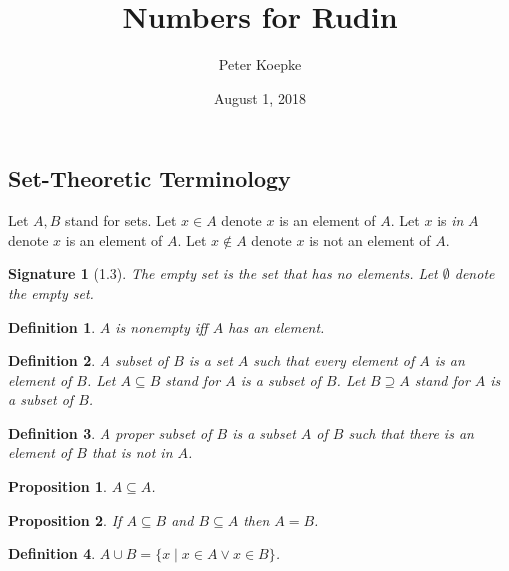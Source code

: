 \documentclass{article}
\newenvironment{forthel}{\begin{leftbar}}{\end{leftbar}}
\newtheorem{definition}{Definition}
\newtheorem{signature}{Signature}
\newtheorem{proposition}{Proposition}
\begin{document}
\title{Numbers for Rudin}

\author{Peter Koepke}

\date{August 1, 2018}

\maketitle

\subsection{Set-Theoretic Terminology}
\begin{forthel}


Let $A,B$ stand for sets.
Let $x \in A$ denote $x$ is an element of $A$.
Let $x$ is \emph{in} $A$ denote $x$ is an element of $A$.
Let $x \notin A$ denote $x$ is not an element of $A$.

\begin{signature}[1.3] The \emph{empty set} is the set that has no elements.
Let $\emptyset$ denote the empty set.
\end{signature}

\begin{definition} $A$ is \emph{nonempty} iff $A$ has an element.
\end{definition}

\begin{definition} A subset of $B$ is a set $A$ such that every element 
of $A$ is an element of $B$. 
Let $A \subseteq B$ stand for $A$ is a subset of $B$.
Let $B \supseteq A$ stand for $A$ is a subset of $B$.
\end{definition}

\begin{definition} A proper subset of $B$ is a subset $A$ of $B$ such that there is an element of $B$ that is not in $A$.
\end{definition}

\begin{proposition} $A \subseteq A$. \end{proposition}

\begin{proposition} If $A \subseteq B$ and $B \subseteq A$ then $A = B$. \end{proposition}

\begin{definition} $A \cup B = \{x \mid x \in A \vee x \in B\}$. \end{definition}

\end{forthel}
\end{document}
